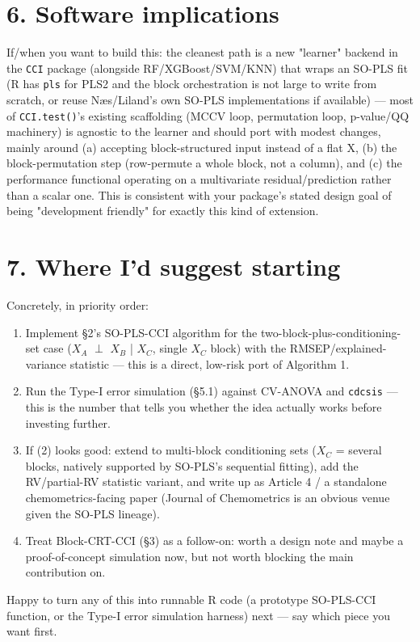 \documentclass[11pt,a4paper]{article}
\begin{document}
	\section{6. Software implications}
	
	If/when you want to build this: the cleanest path is a new "learner" backend in the \texttt{CCI} package (alongside RF/XGBoost/SVM/KNN) that wraps an SO-PLS fit (R has \texttt{pls} for PLS2 and the block orchestration is not large to write from scratch, or reuse Næs/Liland's own SO-PLS implementations if available) — most of \texttt{CCI.test()}'s existing scaffolding (MCCV loop, permutation loop, p-value/QQ machinery) is agnostic to the learner and should port with modest changes, mainly around (a) accepting block-structured input instead of a flat X, (b) the block-permutation step (row-permute a whole block, not a column), and (c) the performance functional operating on a multivariate residual/prediction rather than a scalar one. This is consistent with your package's stated design goal of being "development friendly" for exactly this kind of extension.
	
	
	\section{7. Where I'd suggest starting}
	
	Concretely, in priority order:
	
	\begin{enumerate}
		\item Implement \S{}2's SO-PLS-CCI algorithm for the two-block-plus-conditioning-set case (\(X_A\) \(\perp\) \(X_B\) | \(X_C\), single \(X_C\) block) with the RMSEP/explained-variance statistic — this is a direct, low-risk port of Algorithm 1.
		\item Run the Type-I error simulation (\S{}5.1) against CV-ANOVA and \texttt{cdcsis} — this is the number that tells you whether the idea actually works before investing further.
		\item If (2) looks good: extend to multi-block conditioning sets (\(X_C\) = several blocks, natively supported by SO-PLS's sequential fitting), add the RV/partial-RV statistic variant, and write up as Article 4 / a standalone chemometrics-facing paper (Journal of Chemometrics is an obvious venue given the SO-PLS lineage).
		\item Treat Block-CRT-CCI (\S{}3) as a follow-on: worth a design note and maybe a proof-of-concept simulation now, but not worth blocking the main contribution on.
		
	\end{enumerate}
	Happy to turn any of this into runnable R code (a prototype SO-PLS-CCI function, or the Type-I error simulation harness) next — say which piece you want first.
\end{document}
